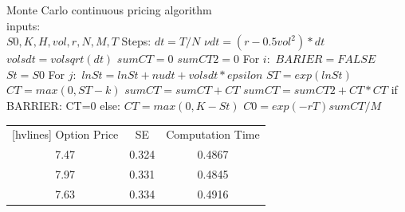 \noindent Monte Carlo continuous pricing algorithm\\
inputs:  \\
$S0, K, H, vol, r, N, M, T$ \newline
Steps:
$dt=T/N$ \newline
$\nu dt=(r-0.5vol^2)*dt$  \newline
$volsdt=volsqrt(dt)$  \newline
$sumCT=0$  \newline
$sumCT2=0$  \newline
For $i:$  \newline
\indent $BARIER= FALSE$ \newline
\indent $St=S0$ \newline
\indent For $j:$ \newline
\indent\indent $lnSt=lnSt+nudt+volsdt*epsilon$  \newline
\indent\indent $ST=exp(lnSt)$  \newline
\indent\indent $CT=max(0,ST-k)$  \newline
\indent\indent $sumCT=sumCT+CT$  \newline
\indent\indent $sumCT=sumCT2+CT*CT$  \newline
\indent\indent if BARRIER: \newline
\indent\indent\indent CT=0 \newline
\indent\indent else: \newline
\indent\indent\indent $CT=max(0,K-St)$ \newline
$C0=exp(-rT)sumCT/M$  \newline
{}


\begin{center}
\begin{NiceTabular}{|c|c|c|}[hvlines]
	 Option Price & SE & Computation Time\\ 
	7.47 & 0.324 & 0.4867\\ 
	7.97 & 0.331 & 0.4845\\
	7.63 & 0.334 & 0.4916\\
\end{NiceTabular}
\end{center}

